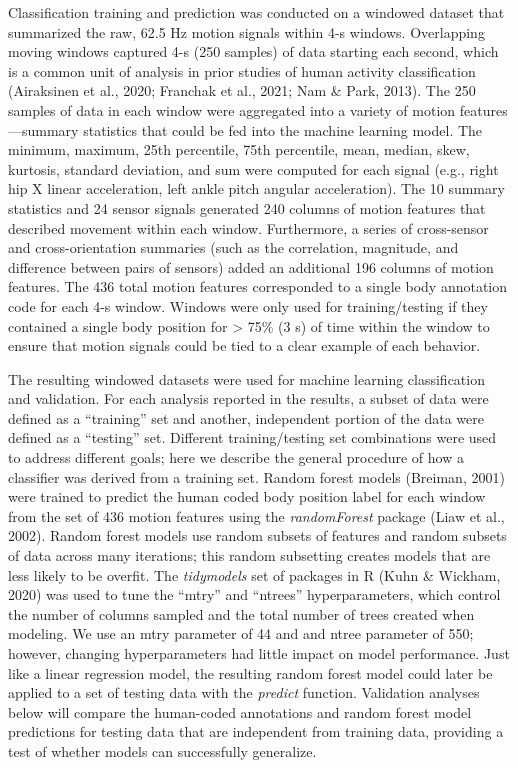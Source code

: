 \documentclass[
  man]{apa6}
\begin{document}
Classification training and prediction was conducted on a windowed dataset that summarized the raw, 62.5 Hz motion signals within 4-s windows. Overlapping moving windows captured 4-s (250 samples) of data starting each second, which is a common unit of analysis in prior studies of human activity classification (Airaksinen et al., 2020; Franchak et al., 2021; Nam \& Park, 2013). The 250 samples of data in each window were aggregated into a variety of motion features---summary statistics that could be fed into the machine learning model. The minimum, maximum, 25th percentile, 75th percentile, mean, median, skew, kurtosis, standard deviation, and sum were computed for each signal (e.g., right hip X linear acceleration, left ankle pitch angular acceleration). The 10 summary statistics and 24 sensor signals generated 240 columns of motion features that described movement within each window. Furthermore, a series of cross-sensor and cross-orientation summaries (such as the correlation, magnitude, and difference between pairs of sensors) added an additional 196 columns of motion features. The 436 total motion features corresponded to a single body annotation code for each 4-s window. Windows were only used for training/testing if they contained a single body position for \textgreater{} 75\% (3 s) of time within the window to ensure that motion signals could be tied to a clear example of each behavior.

The resulting windowed datasets were used for machine learning classification and validation. For each analysis reported in the results, a subset of data were defined as a ``training'' set and another, independent portion of the data were defined as a ``testing'' set. Different training/testing set combinations were used to address different goals; here we describe the general procedure of how a classifier was derived from a training set. Random forest models (Breiman, 2001) were trained to predict the human coded body position label for each window from the set of 436 motion features using the \emph{randomForest} package (Liaw et al., 2002). Random forest models use random subsets of features and random subsets of data across many iterations; this random subsetting creates models that are less likely to be overfit. The \emph{tidymodels} set of packages in R (Kuhn \& Wickham, 2020) was used to tune the ``mtry'' and ``ntrees'' hyperparameters, which control the number of columns sampled and the total number of trees created when modeling. We use an mtry parameter of 44 and and ntree parameter of 550; however, changing hyperparameters had little impact on model performance. Just like a linear regression model, the resulting random forest model could later be applied to a set of testing data with the \emph{predict} function. Validation analyses below will compare the human-coded annotations and random forest model predictions for testing data that are independent from training data, providing a test of whether models can successfully generalize.
\end{document}
